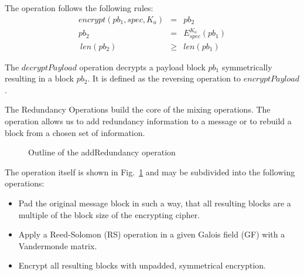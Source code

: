 \documentclass[acmsmall, screen, final, natbib=false]{acmart}
\begin{document}
	The operation follows the following rules:
	\begin{eqnarray}
	encrypt(pb_1, spec, K_a) & = & pb_2 \\
	pb_2 & = & E_{spec}^{K_a}\left( pb_1 \right)\\\
	len(pb_2) & \geq & len(pb_1)
	\end{eqnarray}
	
	
	The $decryptPayload$ operation decrypts a payload block $pb_1$ symmetrically resulting in a block $pb_2$. It is defined as the reversing operation to $encryptPayload$. 
	
	
	The Redundancy Operations build the core of the mixing operations. The operation allows us to add redundancy information to a message or to rebuild a block from a chosen set of information. 
	
	\begin{figure}[ht]\centering
		\resizebox{0.9\columnwidth}{!}{}
		\caption{Outline of the addRedundancy operation}
		\label{fig:addRedundancyOperation}
	\end{figure}
	
	The operation itself is shown in Fig.~\ref{fig:addRedundancyOperation} and may be subdivided into the following operations:
	\begin{itemize}
		\item Pad the original message block in such a way, that all resulting blocks are a multiple of the block size of the encrypting cipher.
		\item Apply a Reed-Solomon (RS) operation in a given Galois field (GF) with a Vandermonde matrix.
		\item Encrypt all resulting blocks with unpadded, symmetrical encryption.
	\end{itemize}
	
\end{document}

